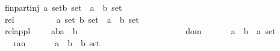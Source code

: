 \begin{isabellebody}
fin{\isacharunderscore}part{\isacharunderscore}inj\ {\isacharcolon}{\isacharcolon}{\isachardoublequoteopen}{\isacharbrackleft}{\isacharprime}a\ set{\isacharcomma}{\isacharprime}b\ set{\isacharbrackright}\ {\isacharequal}{\isachargreater}\ {\isacharparenleft}{\isacharprime}a\ {\isacharless}{\isacharequal}{\isachargreater}\ {\isacharprime}b{\isacharparenright}\ set{\isachardoublequoteclose}\ \ \ \ \ {\isacharparenleft}{\isachardoublequoteopen}{\isacharunderscore}\ {\isasymfinj}\ {\isacharunderscore}{\isachardoublequoteclose}\ \ {\isacharbrackleft}{}{}{\isacharcomma}{}{}{\isacharbrackright}\ {}{}{\isacharparenright}\isanewline
rel\ \ \ \ \ \ \ \ \ \ {\isacharcolon}{\isacharcolon}{\isachardoublequoteopen}{\isacharbrackleft}{\isacharprime}a\ set{\isacharcomma}\ {\isacharprime}b\ set{\isacharbrackright}\ {\isacharequal}{\isachargreater}\ {\isacharparenleft}{\isacharprime}a\ {\isacharless}{\isacharequal}{\isachargreater}\ {\isacharprime}b{\isacharparenright}\ set{\isachardoublequoteclose}\ \ \ \ {\isacharparenleft}{\isachardoublequoteopen}{\isacharunderscore}\ {\isasymrel}\ {\isacharunderscore}{\isachardoublequoteclose}\ \ \ {\isacharbrackleft}{}{}{\isacharcomma}{}{}{\isacharbrackright}\ {}{}{\isacharparenright}\isanewline
rel{\isacharunderscore}appl\ \ \ \ \ {\isacharcolon}{\isacharcolon}{\isachardoublequoteopen}{\isacharbrackleft}{\isacharprime}a{\isacharless}{\isacharequal}{\isachargreater}{\isacharprime}b{\isacharcomma}{\isacharprime}a{\isacharbrackright}\ {\isacharequal}{\isachargreater}\ {\isacharprime}b{\isachardoublequoteclose}\ \ \ \ \ \ \ \ \ \ \ \ \ \ \ \ \ \ \ \ \ {\isacharparenleft}{\isachardoublequoteopen}{\isacharunderscore}{\isasymrappll}{\isacharunderscore}{\isasymrapplr}{\isachardoublequoteclose}\ {\isacharbrackleft}{}{}{\isacharcomma}{}{}{\isacharbrackright}\ {}{}{\isacharparenright}\isanewline
\isanewline
\isanewline
{}\isamarkupfalse%
\isanewline
\ \ dom\ \ \ \ \ \ \ {\isacharcolon}{\isacharcolon}{\isachardoublequoteopen}{\isacharparenleft}{\isacharprime}a\ {\isacharless}{\isacharequal}{\isachargreater}\ {\isacharprime}b{\isacharparenright}\ {\isacharequal}{\isachargreater}\ {\isacharprime}a\ set{\isachardoublequoteclose}\isanewline
\ \ ran\ \ \ \ \ \ \ {\isacharcolon}{\isacharcolon}{\isachardoublequoteopen}{\isacharparenleft}{\isacharprime}a\ {\isacharless}{\isacharequal}{\isachargreater}\ {\isacharprime}b{\isacharparenright}\ {\isacharequal}{\isachargreater}\ {\isacharprime}b\ set{\isachardoublequoteclose}\isanewline

\end{isabellebody}
